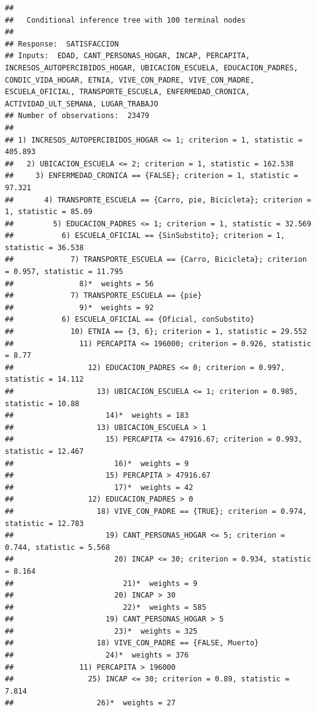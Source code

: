 \documentclass[
]{article}
\begin{document}
\begin{verbatim}
## 
##   Conditional inference tree with 100 terminal nodes
## 
## Response:  SATISFACCION 
## Inputs:  EDAD, CANT_PERSONAS_HOGAR, INCAP, PERCAPITA, INCRESOS_AUTOPERCIBIDOS_HOGAR, UBICACION_ESCUELA, EDUCACION_PADRES, CONDIC_VIDA_HOGAR, ETNIA, VIVE_CON_PADRE, VIVE_CON_MADRE, ESCUELA_OFICIAL, TRANSPORTE_ESCUELA, ENFERMEDAD_CRONICA, ACTIVIDAD_ULT_SEMANA, LUGAR_TRABAJO 
## Number of observations:  23479 
## 
## 1) INCRESOS_AUTOPERCIBIDOS_HOGAR <= 1; criterion = 1, statistic = 405.893
##   2) UBICACION_ESCUELA <= 2; criterion = 1, statistic = 162.538
##     3) ENFERMEDAD_CRONICA == {FALSE}; criterion = 1, statistic = 97.321
##       4) TRANSPORTE_ESCUELA == {Carro, pie, Bicicleta}; criterion = 1, statistic = 85.09
##         5) EDUCACION_PADRES <= 1; criterion = 1, statistic = 32.569
##           6) ESCUELA_OFICIAL == {SinSubstito}; criterion = 1, statistic = 36.538
##             7) TRANSPORTE_ESCUELA == {Carro, Bicicleta}; criterion = 0.957, statistic = 11.795
##               8)*  weights = 56 
##             7) TRANSPORTE_ESCUELA == {pie}
##               9)*  weights = 92 
##           6) ESCUELA_OFICIAL == {Oficial, conSubstito}
##             10) ETNIA == {3, 6}; criterion = 1, statistic = 29.552
##               11) PERCAPITA <= 196000; criterion = 0.926, statistic = 8.77
##                 12) EDUCACION_PADRES <= 0; criterion = 0.997, statistic = 14.112
##                   13) UBICACION_ESCUELA <= 1; criterion = 0.985, statistic = 10.88
##                     14)*  weights = 183 
##                   13) UBICACION_ESCUELA > 1
##                     15) PERCAPITA <= 47916.67; criterion = 0.993, statistic = 12.467
##                       16)*  weights = 9 
##                     15) PERCAPITA > 47916.67
##                       17)*  weights = 42 
##                 12) EDUCACION_PADRES > 0
##                   18) VIVE_CON_PADRE == {TRUE}; criterion = 0.974, statistic = 12.783
##                     19) CANT_PERSONAS_HOGAR <= 5; criterion = 0.744, statistic = 5.568
##                       20) INCAP <= 30; criterion = 0.934, statistic = 8.164
##                         21)*  weights = 9 
##                       20) INCAP > 30
##                         22)*  weights = 585 
##                     19) CANT_PERSONAS_HOGAR > 5
##                       23)*  weights = 325 
##                   18) VIVE_CON_PADRE == {FALSE, Muerto}
##                     24)*  weights = 376 
##               11) PERCAPITA > 196000
##                 25) INCAP <= 30; criterion = 0.89, statistic = 7.814
##                   26)*  weights = 27 

\end{verbatim}
\end{document}
